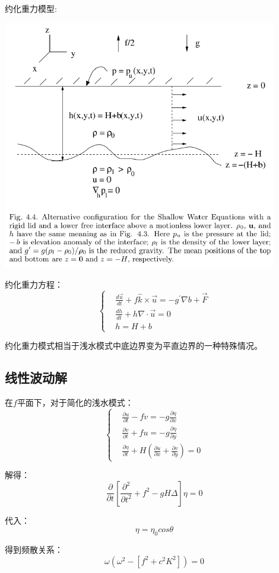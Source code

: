 \documentclass{article}
\begin{document}
约化重力模型:
\begin{center}
    \includegraphics[width=12cm]{Fig3_2.png}
\end{center}
约化重力方程：
$$\begin{cases}
    &\frac{d\vec{u}}{dt} + f\hat{k}\times\vec{u} = -g^{\prime}\nabla b + \vec{F}\\
    &\frac{dh}{dt} + h\nabla\cdot\vec{u} = 0\\
    &h=H+b
\end{cases}$$

约化重力模式相当于浅水模式中底边界变为平直边界的一种特殊情况。

\subsection{线性波动解}
在$f$平面下，对于简化的浅水模式：
$$\begin{cases}
    &\frac{\partial u}{\partial t}-fv=-g\frac{\partial \eta}{\partial x}\\
    &\frac{\partial v}{\partial t}+fu=-g\frac{\partial \eta}{\partial y}\\
    &\frac{\partial \eta}{\partial t}+H(\frac{\partial u}{\partial x}+\frac{\partial v}{\partial y} ) = 0
\end{cases}$$

解得：
$$\frac{\partial }{\partial t}\left[\frac{\partial^2 }{\partial t^2}+f^2-gH\Delta\right]\eta=0 $$

代入：
$$\eta = \eta_0cos\theta$$

得到频散关系：
$$\omega\left(\omega^2-[f^2+c^2K^2]\right)=0$$
\end{document}
